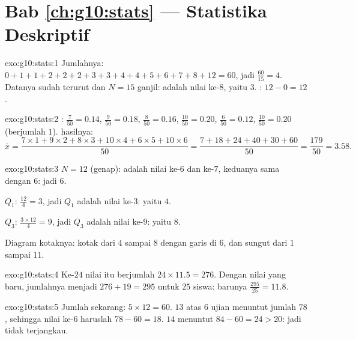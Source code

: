 \section*{Bab \ref{ch:g10:stats} --- Statistika Deskriptif}

\begin{solution}{exo:g10:stats:1}
Jumlahnya: $0+1+1+2+2+2+3+3+4+4+5+6+7+8+12 = 60$, jadi 
$\frac{60}{15} = 4$. Datanya sudah terurut dan $N = 15$ ganjil:
 adalah nilai ke-$8$, yaitu $3$. : $12 - 0 = 12$.
\end{solution}

\begin{solution}{exo:g10:stats:2}
: $\frac{7}{50} = 0.14$, $\frac{9}{50} = 0.18$,
$\frac{8}{50} = 0.16$, $\frac{10}{50} = 0.20$, $\frac{6}{50} = 0.12$,
$\frac{10}{50} = 0.20$ (berjumlah $1$).  hasilnya:
\[
\bar x = \frac{7 \times 1 + 9 \times 2 + 8 \times 3 + 10 \times 4
+ 6 \times 5 + 10 \times 6}{50}
= \frac{7 + 18 + 24 + 40 + 30 + 60}{50}
= \frac{179}{50} = 3.58 .
\]
\end{solution}

\begin{solution}{exo:g10:stats:3}
$N = 12$ (genap):  adalah  nilai ke-$6$ dan ke-$7$,
keduanya sama dengan $6$: jadi  $6$.

$Q_1$: $\frac{12}{4} = 3$, jadi $Q_1$ adalah nilai ke-$3$: yaitu $4$.

$Q_3$: $\frac{3 \times 12}{4} = 9$, jadi $Q_3$ adalah nilai ke-$9$: yaitu $8$.

Diagram kotaknya: kotak dari $4$ sampai $8$ dengan garis  di $6$, dan
sungut dari $1$ sampai $11$.
\end{solution}

\begin{solution}{exo:g10:stats:4}
Ke-$24$ nilai itu berjumlah $24 \times 11.5 = 276$. Dengan nilai
yang baru, jumlahnya menjadi $276 + 19 = 295$ untuk $25$ siswa: 
barunya $\frac{295}{25} = 11.8$.
\end{solution}

\begin{solution}{exo:g10:stats:5}
Jumlah sekarang: $5 \times 12 = 60$.  $13$ atas $6$ ujian menuntut
jumlah $78$, sehingga nilai ke-$6$ haruslah $78 - 60 = 18$. 
$14$ menuntut $84 - 60 = 24 > 20$: jadi tidak terjangkau.
\end{solution}


